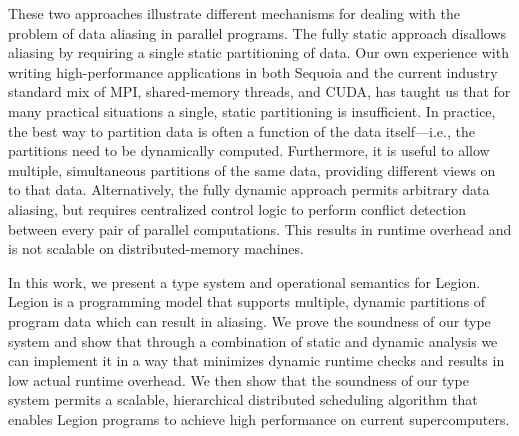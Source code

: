 These two approaches illustrate different mechanisms for dealing with
the problem of data aliasing in parallel programs.  The fully static approach disallows aliasing
by requiring a single static partitioning of data.  Our own experience with writing high-performance 
applications in both Sequoia and the current industry standard mix of MPI, shared-memory
threads, and CUDA, has taught us that for many practical situations a
single, static partitioning is insufficient.  In practice, the
best way to partition data is often a function of the data
itself---i.e., the partitions need to be dynamically computed.
Furthermore, it is useful to allow multiple, simultaneous partitions of
the same data, providing different views on to that data.  Alternatively, 
the fully dynamic approach permits arbitrary data aliasing, but requires 
centralized control logic to perform conflict detection between every pair 
of parallel computations. This results in runtime overhead and is 
not scalable on distributed-memory machines.

In this work, we present a type system and operational semantics for
Legion\cite{Legion12}.  Legion is a programming model that supports multiple,
dynamic partitions of program data which can result in aliasing.  We prove
the soundness of our type system and show that through a combination of
static and dynamic analysis we can implement it in a way that minimizes dynamic
runtime checks and results in low actual runtime overhead.  We then show 
that the soundness of our type system permits a scalable, hierarchical 
distributed scheduling algorithm that enables Legion programs to achieve
high performance on current supercomputers.  

